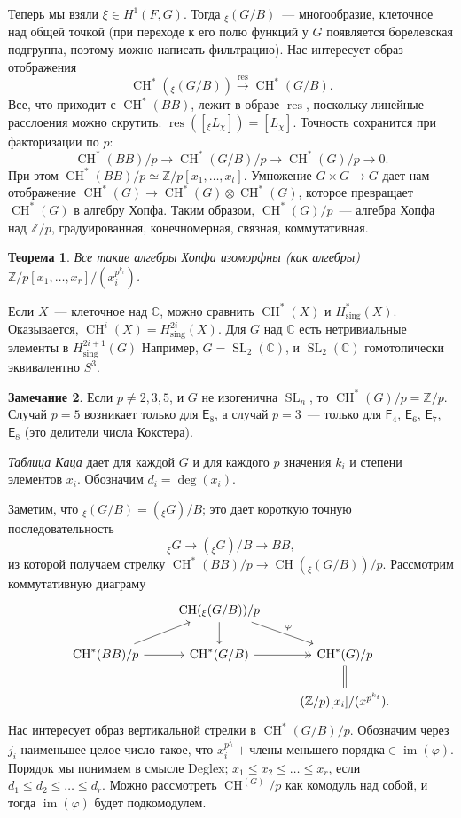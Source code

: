 \documentclass[a4paper]{article}
\DeclareMathOperator{\SL}{SL}
\DeclareMathOperator{\im}{im}
\DeclareMathOperator{\CH}{CH}
\DeclareMathOperator{\res}{res}
\DeclareMathOperator{\sing}{sing}
\newcommand{\ph}{\varphi}
\newcommand{\isom}{\simeq}
\newtheorem{theorem}{Теорема}[subsection]
\theoremstyle{definition}
\newtheorem{remark}[theorem]{Замечание}
\begin{document}
Теперь мы взяли $\xi\in H^1(F,G)$.
Тогда ${}_{\xi}(G/B)$~--- многообразие, клеточное над общей точкой
(при переходе к его полю функций у $G$ появляется борелевская
подгруппа, поэтому можно написать фильтрацию).
Нас интересует образ отображения
\[
\CH^*({}_{\xi}(G/B)) \xrightarrow{\res} \CH^*(G/B).
\]
Все, что приходит с $\CH^*(BB)$, лежит в образе $\res$,
поскольку линейные расслоения можно скрутить:
$\res([{}_{\xi}L_{\chi}]) = [L_{\chi}]$.
Точность сохранится при факторизации по $p$:
\[
\CH^*(BB)/p \to \CH^*(G/B)/p \to \CH^*(G)/p \to 0.
\]
При этом $\CH^*(BB)/p \isom \mathbb{Z}/p[x_1,\dots,x_l]$.
Умножение $G\times G\to G$ дает нам отображение
$\CH^*(G) \to \CH^*(G) \otimes \CH^*(G)$,
которое превращает $\CH^*(G)$ в алгебру Хопфа.
Таким образом, $\CH^*(G)/p$~--- алгебра Хопфа над $\mathbb{Z}/p$,
градуированная, конечномерная, связная, коммутативная.
\begin{theorem}
Все такие алгебры Хопфа изоморфны (как алгебры)
$\mathbb{Z} / p [x_1,\dots,x_r] / (x_i^{p^{k_i}})$.
\end{theorem}
Если $X$~--- клеточное над $\mathbb{C}$, можно сравнить
$\CH^*(X)$ и $H^*_{\sing}(X)$.
Оказывается, $\CH^i(X) = H^{2i}_{\sing}(X)$.
Для $G$ над $\mathbb{C}$ есть нетривиальные элементы
в $H^{2i+1}_{\sing}(G)$
Например, $G = \SL_2(\mathbb{C})$, и $\SL_2(\mathbb{C})$
гомотопически эквивалентно $S^3$.
\begin{remark}
Если $p\neq 2,3,5$, и $G$ не изогенична $\SL_n$,
то $\CH^*(G)/p = \mathbb{Z}/p$.
Случай $p=5$ возникает только для $\mathsf{E}_8$,
а случай $p=3$~--- только для $\mathsf{F}_4$,
$\mathsf{E}_6$, $\mathsf{E}_7$, $\mathsf{E}_8$
(это делители числа Кокстера).
\end{remark}
\emph{Таблица Каца} дает для каждой $G$ и для каждого $p$
значения $k_i$ и степени элементов $x_i$.
Обозначим $d_i = \deg(x_i)$.

Заметим, что ${}_{\xi}(G/B) = ({}_{\xi}G)/B$; это дает короткую
точную последовательность
\[
{}_{\xi}G \to ({}_{\xi}G)/B \to BB,
\]
из которой получаем стрелку $\CH^*(BB)/p \to \CH({}_{\xi}(G/B))/p$.
Рассмотрим коммутативную диаграму
\[
\begin{tikzcd}
& \CH({}_{\xi}(G/B))/p \arrow{d} \arrow{dr}{\ph} \\
\CH^*(BB)/p \arrow{ur} \arrow{r}
& \CH^*(G/B) \arrow[->>]{r}
& \CH^*(G)/p \arrow[equal]{d} \\
& & (\mathbb{Z}/p)[x_i] / (x^{p^{k_i}}).
\end{tikzcd}
\]
Нас интересует образ вертикальной стрелки
в $\CH^*(G/B)/p$.
Обозначим через $j_i$ наименьшее целое число такое, что
$x_i^{p^{j_i}} + \mbox{члены меньшего порядка} \in \im(\ph)$.
Порядок мы понимаем в смысле Deglex;
$x_1\leq x_2\leq\dots\leq x_r$, если
$d_1\leq d_2\leq\dots\leq d_r$.
Можно рассмотреть $\CH^(G)/p$ как комодуль над собой,
и тогда $\im(\ph)$ будет подкомодулем.
\end{document}
